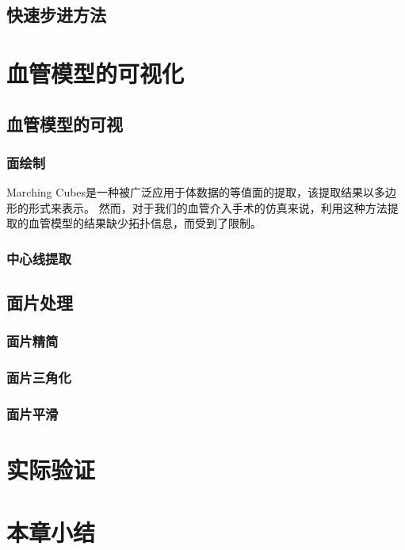 \subsection{快速步进方法}

\cite{Sethian1996FastMarching} \cite{Osher1988LevelSet}


\section{血管模型的可视化}

\subsection{血管模型的可视}

\subsubsection{面绘制}

Marching Cubes\cite{Lorensen1987MC}是一种被广泛应用于体数据的等值面的提取，该提取结果以多边形的形式来表示。
然而，对于我们的血管介入手术的仿真来说，利用这种方法提取的血管模型的结果缺少拓扑信息，而受到了限制\cite{Nowinski2001NeuroCath}\cite{Hahn1998GWU}。

\subsubsection{中心线提取}

\subsection{面片处理}

\subsubsection{面片精简}

\subsubsection{面片三角化}

\subsubsection{面片平滑}


\section{实际验证}

\section{本章小结} 